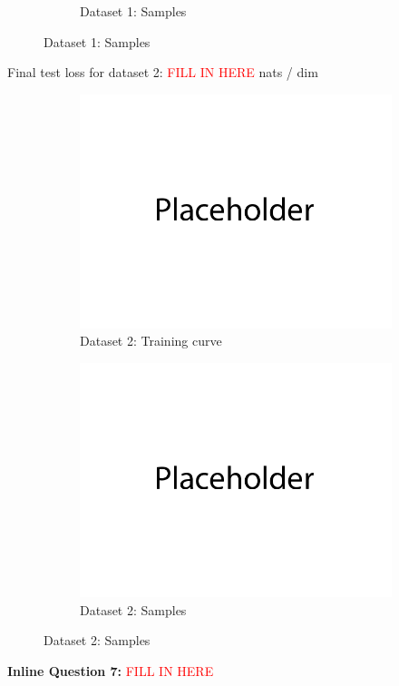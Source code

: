 \documentclass{article}
\begin{document}
\begin{enumerate}[(a)]
\begin{figure}[H]
\begin{subfigure}{0.45\textwidth}
        \caption{Dataset 1: Samples}
    \end{subfigure}
\end{figure}
Final test loss for dataset 2: \textcolor{red}{FILL IN HERE}  nats / dim
\begin{figure}[H]
    \centering
    \begin{subfigure}{0.45\textwidth}
        \centering
        \includegraphics[width=\textwidth]{figures/placeholder.png}
        \caption{Dataset 2: Training curve}
    \end{subfigure}
    \hspace{0.2in}
    \begin{subfigure}{0.45\textwidth}
        \centering
        \includegraphics[width=\textwidth]{figures/placeholder.png}
        \caption{Dataset 2: Samples}
    \end{subfigure}
\end{figure}
\end{enumerate}
\textbf{Inline Question 7:} \textcolor{red}{FILL IN HERE}
\end{document}
